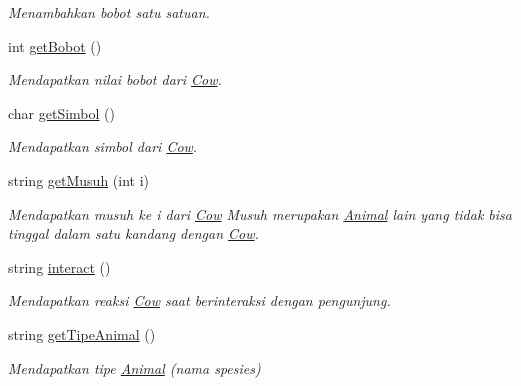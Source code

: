 \begin{DoxyCompactItemize}
\begin{DoxyCompactList}\small\item\em Menambahkan bobot satu satuan. \end{DoxyCompactList}\item 
int \hyperlink{classCow_a64435a687437ce3db8cf38be1984737c}{get\-Bobot} ()
\begin{DoxyCompactList}\small\item\em Mendapatkan nilai bobot dari \hyperlink{classCow}{Cow}. \end{DoxyCompactList}\item 
char \hyperlink{classCow_a2f52ce339a0ee1d19e32ff2010a8ea68}{get\-Simbol} ()
\begin{DoxyCompactList}\small\item\em Mendapatkan simbol dari \hyperlink{classCow}{Cow}. \end{DoxyCompactList}\item 
string \hyperlink{classCow_a006b5864bd414238ae9337dfa8ca193a}{get\-Musuh} (int i)
\begin{DoxyCompactList}\small\item\em Mendapatkan musuh ke i dari \hyperlink{classCow}{Cow} Musuh merupakan \hyperlink{classAnimal}{Animal} lain yang tidak bisa tinggal dalam satu kandang dengan \hyperlink{classCow}{Cow}. \end{DoxyCompactList}\item 
string \hyperlink{classCow_a1299050bf0fa6e933d22d7027428d885}{interact} ()
\begin{DoxyCompactList}\small\item\em Mendapatkan reaksi \hyperlink{classCow}{Cow} saat berinteraksi dengan pengunjung. \end{DoxyCompactList}\item 
string \hyperlink{classCow_aff355d86a92e62f6c3be421173064f3b}{get\-Tipe\-Animal} ()
\begin{DoxyCompactList}\small\item\em Mendapatkan tipe \hyperlink{classAnimal}{Animal} (nama spesies) \end{DoxyCompactList}\end{DoxyCompactItemize}
